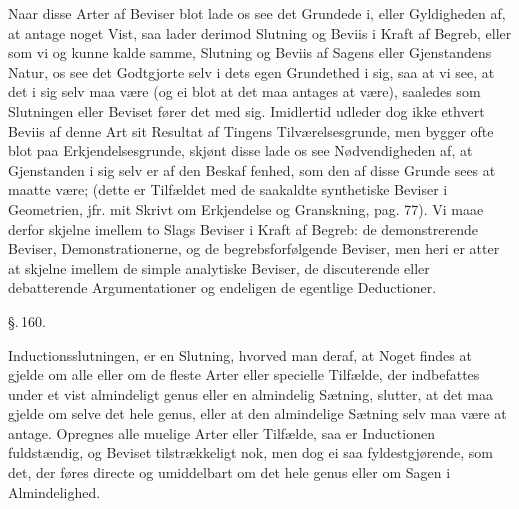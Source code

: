 \documentclass[12pt]{book}
\def\textit#1{#1}%
\def\emph#1{#1}%
\newcommand{\parag}[1]{%
  \par\vspace{0.9\baselineskip}%
  {\centering\textit{\S.\,#1.}\par}%
  \vspace{0.35\baselineskip}%
  \noindent\hspace{\parindent}\ignorespaces
}
\newcommand{\opage}[1]{\marginnote{\footnotesize\textit{[#1]}}}
\begin{document}
Naar disse Arter af Beviser blot lade os see det Grundede i, eller Gyldigheden
af, at antage noget Vist, saa lader derimod Slutning og Beviis i \emph{Kraft af
Begreb}, eller som vi og kunne kalde samme, Slutning og Beviis af \emph{Sagens
eller Gjenstandens Natur}, os see det Godtgjorte selv i dets egen Grundethed i
sig, saa at vi see, at det i sig selv maa være (og ei blot at det maa antages
at være), saaledes som Slutningen eller Beviset fører det med sig. Imidlertid
udleder dog ikke ethvert Beviis af denne Art sit Resultat af Tingens
Tilværelsesgrunde, men bygger ofte blot paa Erkjendelsesgrunde, skjønt disse
lade os see Nødvendigheden af, at Gjenstanden i sig selv er af den Beskaf%
\opage{352}fenhed, som den af disse Grunde sees at maatte være; (dette er Tilfældet med de
saakaldte synthetiske Beviser i Geometrien, jfr. mit Skrivt om Erkjendelse og
Granskning, \textit{pag.} 77). Vi maae derfor skjelne imellem to Slags Beviser i
Kraft af Begreb: de demonstrerende Beviser, Demonstrationerne, og de
begrebsforfølgende Beviser, men heri er atter at skjelne imellem de simple
analytiske Beviser, de discuterende eller debatterende Argumentationer og
endeligen de egentlige Deductioner.

\parag{160}

Inductionsslutningen, er en Slutning, hvorved man deraf, at Noget findes
at gjelde om alle eller om de fleste Arter eller specielle Tilfælde, der
indbefattes under et vist almindeligt \textit{genus} eller en almindelig
Sætning, slutter, at det maa gjelde om selve det hele \textit{genus}, eller at
den almindelige Sætning selv maa være at antage. Opregnes alle muelige Arter
eller Tilfælde, saa er Inductionen fuldstændig, og Beviset tilstrækkeligt nok,
men dog ei saa fyldestgjørende, som det, der føres directe og umiddelbart om det
hele \textit{genus} eller om Sagen i Almindelighed.
\end{document}
